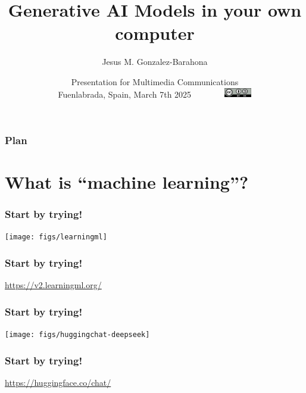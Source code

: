 \documentclass[17pt,aspectratio=169,hyperref={pdfusetitle,colorlinks,allcolors=olive}]{beamer}
\title[Generative AI]{Generative AI Models in your own computer}
\author[Jesus M. Gonzalez-Barahona]{Jesus M. Gonzalez-Barahona}
\institute[URJC]{Universidad Rey Juan Carlos \\
  \url{https://floss.social/@jgbarah} ~~~~~ \url{https://jgbarah.github.io/presentations}}
\date[May 2024]{\small Presentation for Multimedia Communications \\
  Fuenlabrada, Spain, March 7th 2025~~~~~~~~\includegraphics[width=1.2cm]{figs/by-sa}}
\begin{document}
\begin{frame}
  \maketitle
\end{frame}



\begin{frame}
  \frametitle{Plan}
\tableofcontents
\end{frame}


\section{What is ``machine learning''?}

\begin{frame}[fragile]
  \frametitle{Start by trying!}

  \begin{center}
    \texttt{[image: figs/learningml]}
  \end{center}
\end{frame}

\begin{frame}[fragile]
  \frametitle{Start by trying!}

  \begin{center}
    {\Large
      \url{https://v2.learningml.org/}
    }
  \end{center}
\end{frame}

\begin{frame}[fragile]
  \frametitle{Start by trying!}

  \begin{center}
    \texttt{[image: figs/huggingchat-deepseek]}
  \end{center}
\end{frame}

\begin{frame}[fragile]
  \frametitle{Start by trying!}

  \begin{center}
    {\Large
      \url{https://huggingface.co/chat/}
    }
  \end{center}
\end{frame}
\end{document}

